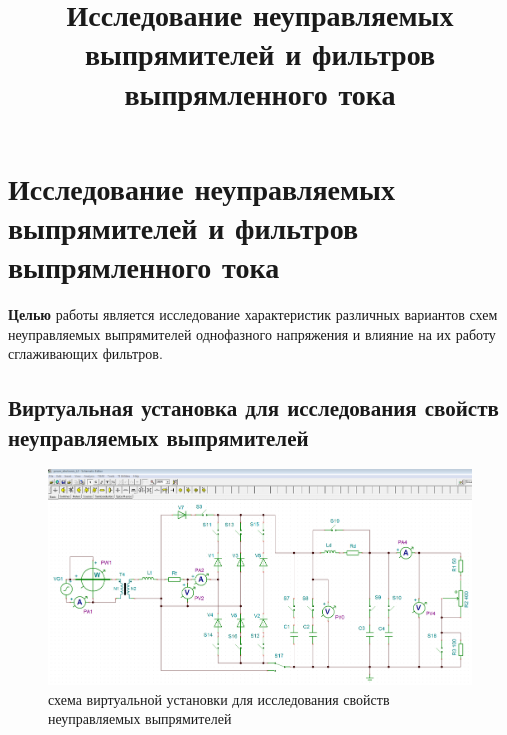 

\title{Исследование неуправляемых выпрямителей и фильтров выпрямленного тока}
\author{}


\section{Исследование неуправляемых выпрямителей и фильтров выпрямленного тока}

{\bf Целью} работы является исследование характеристик различных вариантов схем неуправляемых выпрямителей однофазного напряжения 
и влияние на их работу сглаживающих фильтров.
 
\subsection{Виртуальная установка для исследования свойств неуправляемых выпрямителей} 

\begin{figure}[!ht]
\centering
\includegraphics[scale=0.4, angle=90]{setup_lab2}
\caption{схема виртуальной установки для исследования свойств неуправляемых выпрямителей}
\label{setup}
\end{figure}

